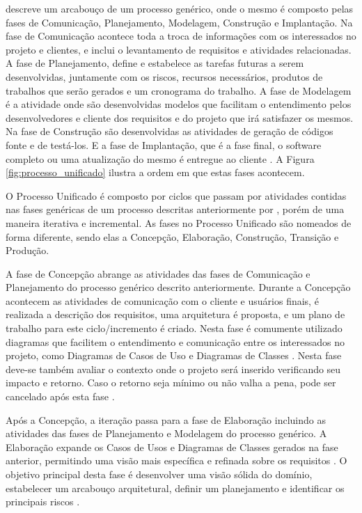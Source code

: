  descreve um arcabouço de um processo genérico, onde o mesmo é composto pelas fases de Comunicação, Planejamento, Modelagem, Construção e Implantação. Na fase de Comunicação acontece toda a troca de informações com os interessados no projeto e clientes, e inclui o levantamento de requisitos e atividades relacionadas. A fase de Planejamento, define e estabelece as tarefas futuras a serem desenvolvidas, juntamente com os riscos, recursos necessários, produtos de trabalhos que serão gerados e um cronograma do trabalho. A fase de Modelagem é a atividade onde são desenvolvidas modelos que facilitam o entendimento pelos desenvolvedores e cliente dos requisitos e do projeto que irá satisfazer os mesmos. Na fase de Construção são desenvolvidas as atividades de geração de códigos fonte e de testá-los. E a fase de Implantação, que é a fase final, o software completo ou uma atualização do mesmo é entregue ao cliente \cite{pressman06}. A Figura \ref{fig:processo_unificado} ilustra a ordem em que estas fases acontecem.

O Processo Unificado é composto por ciclos que passam por atividades contidas nas fases genéricas de um processo descritas anteriormente por , porém de uma maneira iterativa e incremental. As fases no Processo Unificado são nomeados de forma diferente, sendo elas a Concepção, Elaboração, Construção, Transição e Produção.

A fase de Concepção abrange as atividades das fases de Comunicação e Planejamento do processo genérico descrito anteriormente. Durante a Concepção acontecem as atividades de comunicação com o cliente e usuários finais, é realizada a descrição dos requisitos, uma arquitetura é proposta, e um plano de trabalho para este ciclo/incremento é criado. Nesta fase é comumente utilizado diagramas que facilitem o entendimento e comunicação entre os interessados no projeto, como Diagramas de Casos de Uso e Diagramas de Classes \cite{pressman06}. Nesta fase deve-se também avaliar o contexto onde o projeto será inserido verificando seu impacto e retorno. Caso o retorno seja mínimo ou não valha a pena, pode ser cancelado após esta fase \cite{sommerville10}.

Após a Concepção, a iteração passa para a fase de Elaboração incluindo as atividades das fases de Planejamento e Modelagem do processo genérico. A Elaboração expande os Casos de Usos e Diagramas de Classes gerados na fase anterior, permitindo uma visão mais específica e refinada sobre os requisitos \cite{pressman06}. O objetivo principal desta fase é desenvolver uma visão sólida do domínio, estabelecer um arcabouço arquitetural, definir um planejamento e identificar os principais riscos \cite{sommerville10}.

